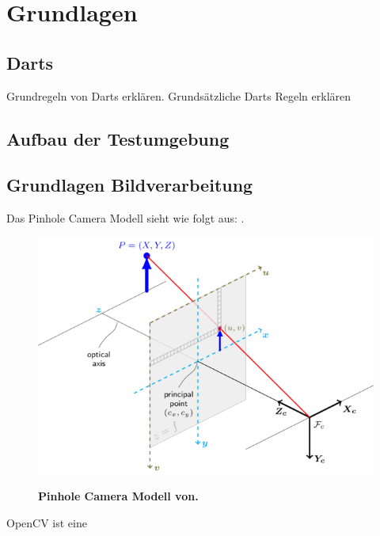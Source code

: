 
\chapter{Grundlagen}
\label{chap:fundamentals}

\section{Darts}
Grundregeln von Darts erklären.
Grundsätzliche Darts Regeln erklären
\section{Aufbau der Testumgebung}

\section{Grundlagen Bildverarbeitung}
\label{sec:basics}
Das Pinhole Camera Modell sieht wie folgt aus: \autocite{Zhang2000}.
\begin{figure}
\includegraphics[scale =0.75]{media/pinhole_camera_model}\\
\caption{\textbf{Pinhole Camera Modell von.\autocite{OpencvCamera2016}}
}
\label{Fig:pinhole}
\end{figure}
\vspace{11mm}
	
	\vspace{3mm}

OpenCV ist eine \autocite[512--]{Medioni:2004:ETC:993884}

